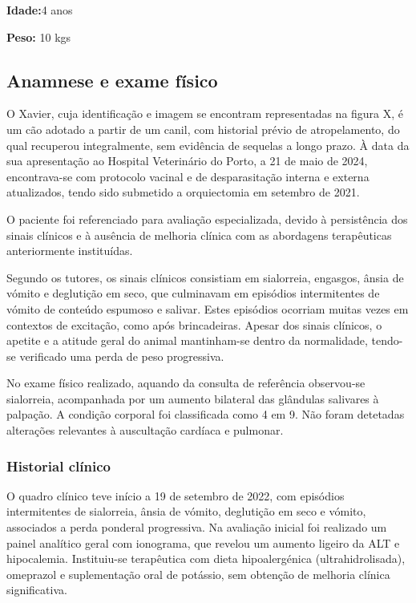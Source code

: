 \textbf{Idade:}4 anos


\textbf{Peso:} 10 kgs

\subsection{Anamnese e exame físico}

O Xavier, cuja identificação e imagem se encontram representadas na figura X, é um cão adotado a partir de um canil, com historial prévio de atropelamento, do qual recuperou integralmente, sem evidência de sequelas a longo prazo. À data da sua apresentação ao Hospital Veterinário do Porto, a 21 de maio de 2024, encontrava-se com protocolo vacinal e de desparasitação interna e externa atualizados, tendo sido submetido a orquiectomia em setembro de 2021. 


O paciente foi referenciado para avaliação especializada, devido à persistência dos sinais clínicos e à ausência de melhoria clínica com as abordagens terapêuticas anteriormente instituídas.


Segundo os tutores, os sinais clínicos consistiam em sialorreia, engasgos, ânsia de vómito e deglutição em seco, que culminavam em episódios intermitentes de vómito de conteúdo espumoso e salivar. Estes episódios ocorriam muitas vezes em contextos de excitação, como após brincadeiras. Apesar dos sinais clínicos, o apetite e a atitude geral do animal mantinham-se dentro da normalidade, tendo-se verificado uma perda de peso progressiva.


No exame físico realizado, aquando da consulta de referência observou-se sialorreia, acompanhada por um aumento bilateral das glândulas salivares à palpação. A condição corporal foi classificada como 4 em 9. Não foram detetadas alterações relevantes à auscultação cardíaca e pulmonar.

\subsubsection{Historial clínico}


O quadro clínico teve início a 19 de setembro de 2022, com episódios intermitentes de sialorreia, ânsia de vómito, deglutição em seco e vómito, associados a perda ponderal progressiva. Na avaliação inicial foi realizado um painel analítico geral com ionograma, que revelou um aumento ligeiro da ALT e hipocalemia. Instituiu-se terapêutica com dieta hipoalergénica (ultrahidrolisada), omeprazol e suplementação oral de potássio, sem obtenção de melhoria clínica significativa.


